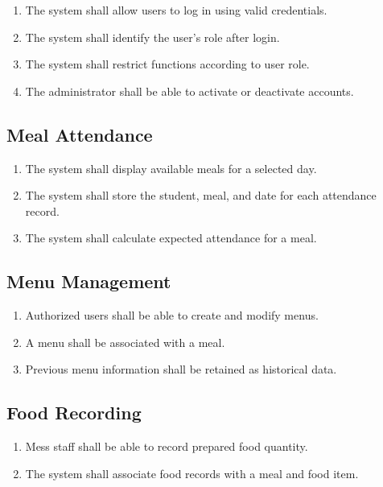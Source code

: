 \documentclass[12pt,a4paper]{report}
\begin{document}
	\begin{enumerate}[leftmargin=*]
		\item The system shall allow users to log in using valid credentials.
		\item The system shall identify the user's role after login.
		\item The system shall restrict functions according to user role.
		\item The administrator shall be able to activate or deactivate accounts.
	\end{enumerate}
	
	\subsection{Meal Attendance}
	
	\begin{enumerate}[leftmargin=*]
		\item The system shall display available meals for a selected day.
		\item The system shall store the student, meal, and date for each attendance record.
		\item The system shall calculate expected attendance for a meal.
	\end{enumerate}
	
	\subsection{Menu Management}
	
	\begin{enumerate}[leftmargin=*]
		\item Authorized users shall be able to create and modify menus.
		\item A menu shall be associated with a meal.
		\item Previous menu information shall be retained as historical data.
	\end{enumerate}
	
	\subsection{Food Recording}
	
	\begin{enumerate}[leftmargin=*]
		\item Mess staff shall be able to record prepared food quantity.
		\item The system shall associate food records with a meal and food item.
	\end{enumerate}
	
\end{document}
